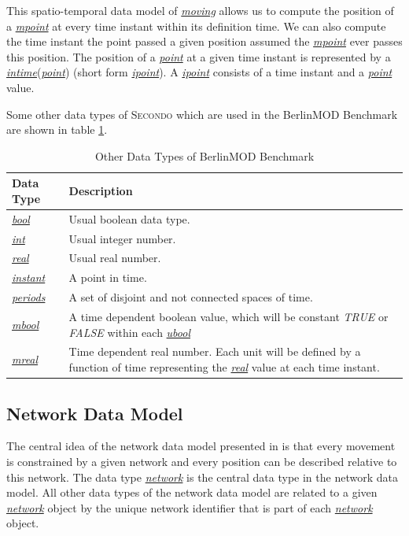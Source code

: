\documentclass[a4paper]{article}
\newcommand{\secondo}{\textsc{Secondo}}
\newcommand{\bmodb} {BerlinMOD Benchmark}
\newcommand{\dt}[1]{\textsl{\underline{#1}}}
\newcommand{\true}{\textsl{TRUE}}
\newcommand{\false}{\textsl{FALSE}}
\begin{document}
This spatio-temporal data model of \dt{moving} allows us to compute the position
of a \dt{mpoint} at every time instant within its definition time.
We can also compute the time instant the point passed a
given position assumed the \dt{mpoint} ever passes this position. The position of a
\dt{point} at a given time instant is represented by a \dt{intime}(\dt{point})
(short form \dt{ipoint}). A \dt{ipoint} consists of a time instant and a \dt{point} value.

Some other data types of \secondo{} which are used in the \bmodb{} are shown in
table \ref{tab:bmodbdatatypes}.
\begin{table}[H]
\begin{center}
\begin{scriptsize}
\begin{tabularx}{1.0\textwidth}{|l|X|}
\hline
\textbf{Data Type} & \textbf{Description} \\
\hline
\dt{bool} & Usual boolean data type.\\
\hline
\dt{int} & Usual integer number.\\
\hline
\dt{real} & Usual real number.\\
\hline
\dt{instant} & A point in time.\\
\hline
\dt{periods} & A set of disjoint and not connected spaces of time.\\
\hline
\dt{mbool} & A time dependent boolean value, which will be constant \true{} or \false{}
within each \dt{ubool} \\
\hline
\dt{mreal} & Time dependent real number. Each unit will be defined by a function
of time representing the \dt{real} value at each time instant.\\
\hline
\end{tabularx}
\end{scriptsize}
\caption{Other Data Types of \bmodb{}}
\label{tab:bmodbdatatypes}
\end{center}
\end{table}
\subsection{Network Data Model}
\label{sec:netdatamod}
The central idea of the network data model presented in \cite{1146465} is that
every movement is constrained by a given network and every position can be described
relative to this network. The data type \dt{network} is the central
data type in the network data model. All other data types of the network data model
are related to a given \dt{network} object by the unique network identifier that
is part of each \dt{network} object.
\end{document}
